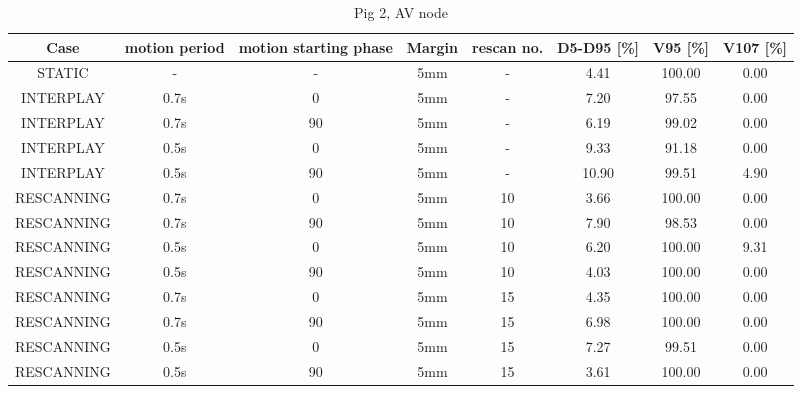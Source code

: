 \documentclass[type=dr, dr=rernat, accentcolor=tud7b,colorbacktitle, bigchapter, openright, twoside, 12pt ]{tudthesis}
\begin{document}
\begin{table}[H]
  \centering
\tiny
  \caption{Pig 2, AV node}
  \begin{tabular}{|c||c|c|c|c||c|c|c|}
    \hline\hline
    Case & motion period & motion starting phase & Margin & rescan no. & D5-D95 [\%] & V95 [\%] & V107 [\%] \\
    \hline 
STATIC & - & - & 5mm & - & 4.41 & 100.00 & 0.00\\
INTERPLAY & 0.7s & 0 & 5mm & - & 7.20 & 97.55 & 0.00\\
INTERPLAY & 0.7s & 90 & 5mm & - & 6.19 & 99.02 & 0.00\\
INTERPLAY & 0.5s & 0 & 5mm & - & 9.33 & 91.18 & 0.00\\
INTERPLAY & 0.5s & 90 & 5mm & - & 10.90 & 99.51 & 4.90\\
RESCANNING & 0.7s & 0 & 5mm & 10 & 3.66 & 100.00 & 0.00\\
RESCANNING & 0.7s & 90 & 5mm & 10 & 7.90 & 98.53 & 0.00\\
RESCANNING & 0.5s & 0 & 5mm & 10 & 6.20 & 100.00 & 9.31\\
RESCANNING & 0.5s & 90 & 5mm & 10 & 4.03 & 100.00 & 0.00\\
RESCANNING & 0.7s & 0 & 5mm & 15 & 4.35 & 100.00 & 0.00\\
RESCANNING & 0.7s & 90 & 5mm & 15 & 6.98 & 100.00 & 0.00\\
RESCANNING & 0.5s & 0 & 5mm & 15 & 7.27 & 99.51 & 0.00\\
RESCANNING & 0.5s & 90 & 5mm & 15 & 3.61 & 100.00 & 0.00\\
    \hline\hline 
  \end{tabular}
  \label{tab:Pig2_AV}
\end{table}

\vspace*{-0.4cm}
\end{document}
